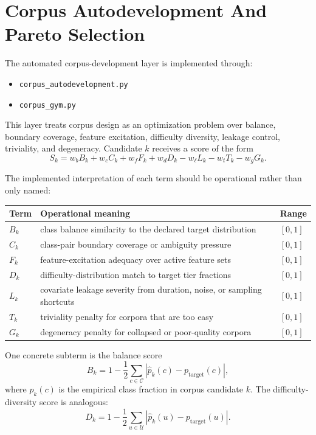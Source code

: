 \documentclass[11pt]{article}
\begin{document}
\section{Corpus Autodevelopment And Pareto Selection}

The automated corpus-development layer is implemented through:
\begin{itemize}[leftmargin=1.5em]
    \item \texttt{corpus\_autodevelopment.py}
    \item \texttt{corpus\_gym.py}
\end{itemize}

This layer treats corpus design as an optimization problem over balance,
boundary coverage, feature excitation, difficulty diversity, leakage control,
triviality, and degeneracy. Candidate \(k\) receives a score of the form
\begin{equation}
    S_k
    =
    w_b B_k
    + w_c C_k
    + w_f F_k
    + w_d D_k
    - w_\ell L_k
    - w_t T_k
    - w_g G_k.
\end{equation}

The implemented interpretation of each term should be operational rather than
only named:
\begin{center}
\small
\begin{tabularx}{\textwidth}{lXl}
\toprule
Term & Operational meaning & Range \\
\midrule
\(B_k\) & class balance similarity to the declared target distribution & \([0,1]\) \\
\(C_k\) & class-pair boundary coverage or ambiguity pressure & \([0,1]\) \\
\(F_k\) & feature-excitation adequacy over active feature sets & \([0,1]\) \\
\(D_k\) & difficulty-distribution match to target tier fractions & \([0,1]\) \\
\(L_k\) & covariate leakage severity from duration, noise, or sampling shortcuts & \([0,1]\) \\
\(T_k\) & triviality penalty for corpora that are too easy & \([0,1]\) \\
\(G_k\) & degeneracy penalty for collapsed or poor-quality corpora & \([0,1]\) \\
\bottomrule
\end{tabularx}
\end{center}

One concrete subterm is the balance score
\begin{equation}
    B_k
    =
    1 - \frac{1}{2}
    \sum_{c \in \mathcal{C}}
    \left|
        \hat{p}_k(c) - p_{\text{target}}(c)
    \right|,
\end{equation}
where \(\hat{p}_k(c)\) is the empirical class fraction in corpus candidate
\(k\). The difficulty-diversity score is analogous:
\begin{equation}
    D_k
    =
    1 - \frac{1}{2}
    \sum_{u \in \mathcal{U}}
    \left|
        \hat{p}_k(u) - p_{\text{target}}(u)
    \right|.
\end{equation}
\end{document}
